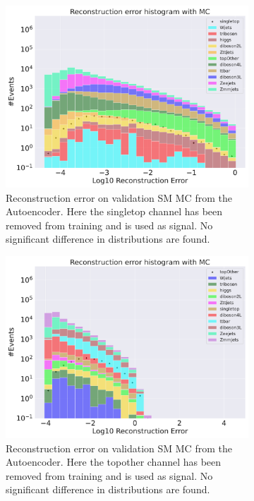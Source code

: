 \begin{figure}[h!]
    \centering
    \begin{subfigure}{.8\textwidth}
        \includegraphics[width=\textwidth]{Figures/AE_testing/small/b_data_recon_big_rm3_feats_sig_singletop.pdf}
        \caption{Reconstruction error on validation SM MC from the Autoencoder. Here the singletop channel has been removed from training and 
        is used as signal. No significant difference in distributions are found. }
        \label{fig:ae_small_singletop}
    \end{subfigure}
    \hfill
    \begin{subfigure}{.8\textwidth}
        \includegraphics[width=\textwidth]{Figures/AE_testing/small/b_data_recon_big_rm3_feats_sig_topOther.pdf}
        \caption{Reconstruction error on validation SM MC from the Autoencoder. Here the topother channel has been removed from training and 
        is used as signal. No significant difference in distributions are found. }
        \label{fig:ae_small_topOther}
    \end{subfigure}
    \hfill        
    \caption{ }
    \label{fig:ae_small_channel3}
\end{figure}


